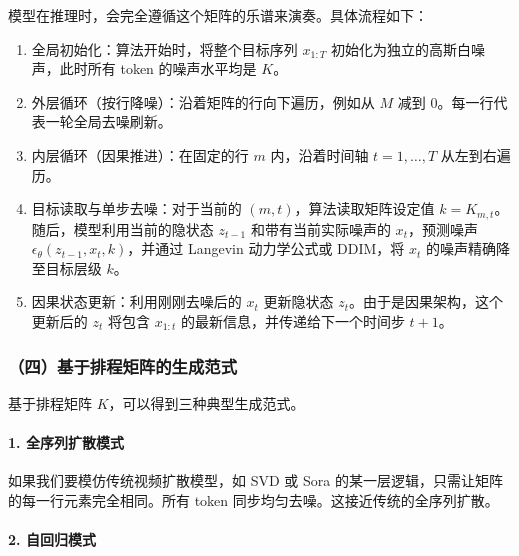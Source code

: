 模型在推理时，会完全遵循这个矩阵的乐谱来演奏。具体流程如下：

\begin{enumerate}
\def\labelenumi{\arabic{enumi}.}
\tightlist
\item
  全局初始化：算法开始时，将整个目标序列 \(x_{1:T}\) 初始化为独立的高斯白噪声，此时所有 token 的噪声水平均是 \(K\)。
\item
  外层循环（按行降噪）：沿着矩阵的行向下遍历，例如从 \(M\) 减到 \(0\)。每一行代表一轮全局去噪刷新。
\item
  内层循环（因果推进）：在固定的行 \(m\) 内，沿着时间轴 \(t=1,\ldots,T\) 从左到右遍历。
\item
  目标读取与单步去噪：对于当前的 \((m,t)\)，算法读取矩阵设定值 \(k=K_{m,t}\)。随后，模型利用当前的隐状态 \(z_{t-1}\) 和带有当前实际噪声的 \(x_t\)，预测噪声 \(\epsilon_\theta(z_{t-1},x_t,k)\)，并通过 Langevin 动力学公式或 DDIM，将 \(x_t\) 的噪声精确降至目标层级 \(k\)。
\item
  因果状态更新：利用刚刚去噪后的 \(x_t\) 更新隐状态 \(z_t\)。由于是因果架构，这个更新后的 \(z_t\) 将包含 \(x_{1:t}\) 的最新信息，并传递给下一个时间步 \(t+1\)。
\end{enumerate}

\hypertarget{ux56dbux57faux4e8eux6392ux7a0bux77e9ux9635ux7684ux751fux6210ux8303ux5f0f}{%
\subsubsection{（四）基于排程矩阵的生成范式}\label{ux56dbux57faux4e8eux6392ux7a0bux77e9ux9635ux7684ux751fux6210ux8303ux5f0f}}

基于排程矩阵 \(K\)，可以得到三种典型生成范式。

\hypertarget{ux5168ux5e8fux5217ux6269ux6563ux6a21ux5f0f}{%
\paragraph{1. 全序列扩散模式}\label{ux5168ux5e8fux5217ux6269ux6563ux6a21ux5f0f}}

如果我们要模仿传统视频扩散模型，如 SVD 或 Sora 的某一层逻辑，只需让矩阵的每一行元素完全相同。所有 token 同步均匀去噪。这接近传统的全序列扩散。

\hypertarget{ux81eaux56deux5f52ux6a21ux5f0f}{%
\paragraph{2. 自回归模式}\label{ux81eaux56deux5f52ux6a21ux5f0f}}

